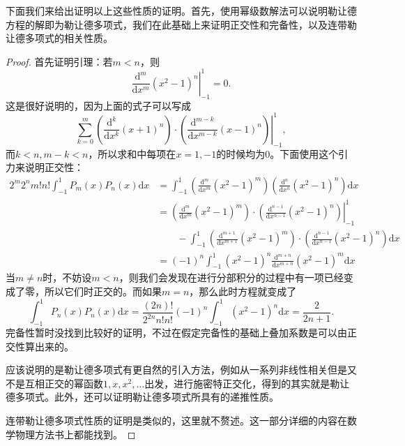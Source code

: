 \documentclass[UTF8]{ctexbook}
\renewcommand{\d}{\mathrm{d}}
\newtheorem{proof}{证明}
\numberwithin{equation}{chapter}
\begin{document}
	下面我们来给出证明以上这些性质的证明。首先，使用幂级数解法可以说明勒让德方程的解即为勒让德多项式，我们在此基础上来证明正交性和完备性，以及连带勒让德多项式的相关性质。
	\begin{proof}
		首先证明引理：若$m<n$，则
		\[\left.\frac{\d^m}{\d x^m}(x^2-1)^n\right|_{-1}^1=0.\]
		这是很好说明的，因为上面的式子可以写成
		\[\left.\sum_{k=0}^m \left(\frac{\d^k}{\d x^k}(x+1)^n\right)\cdot\left(\frac{\d^{m-k}}{\d x^{m-k}}(x-1)^n\right)\right|_{-1}^1, \]
		而$k<n,m-k<n$，所以求和中每项在$x=1,-1$的时候均为0。下面使用这个引力来说明正交性：
		\begin{align*}
			2^m2^nm!n!\int_{-1}^1 P_m(x)P_n(x)\d x&=\int_{-1}^1 \left(\frac{\d^m}{\d x^m}(x^2-1)^m\right)\left(\frac{\d^n}{\d x^n}(x^2-1)^n\right)\d x \\
			&=\left.\left(\frac{\d^m }{\d x^m}(x^2-1)^m\right)\cdot\left(\frac{\d^{n-1}}{\d x^{n-1}}(x^2-1)^n\right)\right|_{-1}^1 \\
			&\qquad -\int_{-1}^1 \left(\frac{\d^{m+1} }{\d x^{m+1}}(x^2-1)^m\right)\cdot\left(\frac{\d^{n-1}}{\d x^{n-1}}(x^2-1)^n\right)\d x \\
			&=(-1)^n\int_{-1}^1 (x^2-1)^n\frac{\d^{m+n}}{\d x^{m+n}}(x^2-1)^m \d x
		\end{align*}
		当$m\neq n$时，不妨设$m < n$，则我们会发现在进行分部积分的过程中有一项已经变成了零，所以它们时正交的。而如果$m=n$，那么此时方程就变成了
		\[\int_{-1}^1 P_n(x)P_n(x)\d x=\frac{(2n)!}{2^{2n}n!n!}(-1)^n\int_{-1}^1(x^2-1)^n\d x=\frac{2}{2n+1}.\]
		完备性暂时没找到比较好的证明，不过在假定完备性的基础上叠加系数是可以由正交性算出来的。
		
		应该说明的是勒让德多项式有更自然的引入方法，例如从一系列非线性相关但是又不是互相正交的幂函数$1,x,x^2,\dots$出发，进行施密特正交化，得到的其实就是勒让德多项式。此外，还可以证明勒让德多项式所具有的递推性质。
		
		连带勒让德多项式性质的证明是类似的，这里就不赘述。这一部分详细的内容在数学物理方法书上都能找到。
	\end{proof}
	
\end{document}
